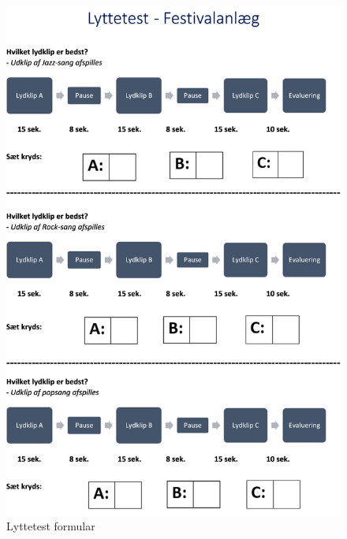 \begin{figure}[H] 
	\center
	\includegraphics[width=0.9\linewidth]{figur/Lyttetest}\quad
	\caption{Lyttetest formular}
	\label{fig:Lyttetest}
\end{figure}
